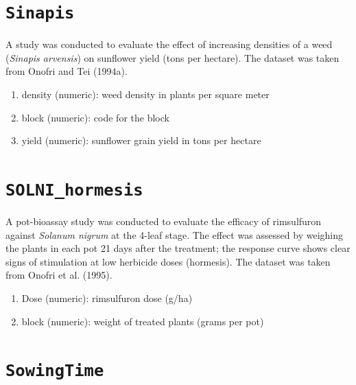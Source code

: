 \documentclass[
  letterpaper,
  DIV=11,
  numbers=noendperiod]{scrreprt}
\providecommand{\tightlist}{%
  \setlength{\itemsep}{0pt}\setlength{\parskip}{0pt}}
\begin{document}
\section*{\texorpdfstring{\texttt{Sinapis}}{Sinapis}}\label{sinapis}


A study was conducted to evaluate the effect of increasing densities of
a weed (\emph{Sinapis arvensis}) on sunflower yield (tons per hectare).
The dataset was taken from Onofri and Tei (1994a).

\begin{enumerate}
\def\labelenumi{\arabic{enumi}.}
\tightlist
\item
  density (numeric): weed density in plants per square meter
\item
  block (numeric): code for the block
\item
  yield (numeric): sunflower grain yield in tons per hectare
\end{enumerate}

\section*{\texorpdfstring{\texttt{SOLNI\_hormesis}}{SOLNI\_hormesis}}\label{SOLNI_hormesis}


A pot-bioassay study was conducted to evaluate the efficacy of
rimsulfuron against \emph{Solanum nigrum} at the 4-leaf stage. The
effect was assessed by weighing the plants in each pot 21 days after the
treatment; the response curve shows clear signs of stimulation at low
herbicide doses (hormesis). The dataset was taken from Onofri et al.
(1995).

\begin{enumerate}
\def\labelenumi{\arabic{enumi}.}
\tightlist
\item
  Dose (numeric): rimsulfuron dose (g/ha)
\item
  block (numeric): weight of treated plants (grams per pot)
\end{enumerate}

\section*{\texorpdfstring{\texttt{SowingTime}}{SowingTime}}\label{sowingtime}
\end{document}
